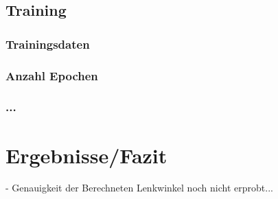 \documentclass[a4paper, 12pt]{scrartcl}
\begin{document}
			\subsection{Training}
				\subsubsection{Trainingsdaten}
				\subsubsection{Anzahl Epochen}
				\subsubsection{...}
			
	\section{Ergebnisse/Fazit}
	- Genauigkeit der Berechneten Lenkwinkel noch nicht erprobt...
\end{document}
